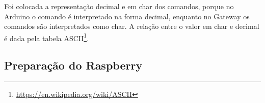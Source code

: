 		Foi colocada a representação decimal e em char dos comandos, porque no Arduino o comando é interpretado na forma decimal, enquanto no Gateway os comandos são interpretados como char. A relação entre o valor em char e decimal é dada pela tabela ASCII\footnote{\url{https://en.wikipedia.org/wiki/ASCII}}.
		
	\subsection{Preparação do Raspberry}
			